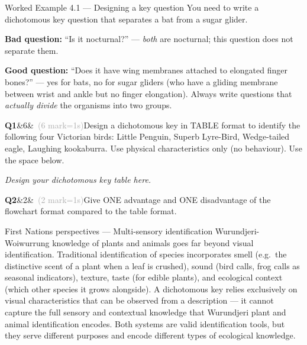 \documentclass[11pt,a4paper]{article}
\newcommand{\answerbox}[1]{%
  \begin{tcolorbox}[
    enhanced, breakable, arc=2mm,
    colback=Paper, colframe=Line,
    left=2mm, right=2mm, top=1mm, bottom=1mm,
    boxrule=1pt,
    height=#1
  ]
  \end{tcolorbox}%
}
\newcommand{\question}[3]{%
  \needspace{3\baselineskip}%
  \medskip
  \noindent\textbf{Q#1}\ifx&#2&\else\ \textcolor{DarkGrey}{(#2 mark\ifnum#2=1\else s\fi)}\fi\quad #3%
  \medskip
}
\begin{document}
\begin{workedex}{Worked Example 4.1 --- Designing a key question}
You need to write a dichotomous key question that separates a bat from a sugar glider.

\medskip
\textbf{Bad question:} ``Is it nocturnal?'' --- \textit{both} are nocturnal; this question does not separate them.

\textbf{Good question:} ``Does it have wing membranes attached to elongated finger bones?'' --- yes for bats, no for sugar gliders (who have a gliding membrane between wrist and ankle but no finger elongation). Always write questions that \textit{actually divide} the organisms into two groups.
\end{workedex}

\begin{yr7box}
\question{1}{6}{Design a dichotomous key in TABLE format to identify the following four Victorian birds: Little Penguin, Superb Lyre-Bird, Wedge-tailed eagle, Laughing kookaburra. Use physical characteristics only (no behaviour). Use the space below.}

\vspace{4pt}
\begin{tcolorbox}[colback=white, colframe=MidGrey, height=7cm, boxrule=0.5pt]
\textit{\color{MidGrey}Design your dichotomous key table here.}
\end{tcolorbox}

\question{2}{2}{Give ONE advantage and ONE disadvantage of the flowchart format compared to the table format.}
\answerbox{3cm}
\end{yr7box}

\begin{fnbox}{First Nations perspectives --- Multi-sensory identification}
Wurundjeri-Woiwurrung knowledge of plants and animals goes far beyond visual identification. Traditional identification of species incorporates smell (e.g.\ the distinctive scent of a plant when a leaf is crushed), sound (bird calls, frog calls as seasonal indicators), texture, taste (for edible plants), and ecological context (which other species it grows alongside). A dichotomous key relies exclusively on visual characteristics that can be observed from a description --- it cannot capture the full sensory and contextual knowledge that Wurundjeri plant and animal identification encodes. Both systems are valid identification tools, but they serve different purposes and encode different types of ecological knowledge.
\end{fnbox}
\end{document}
